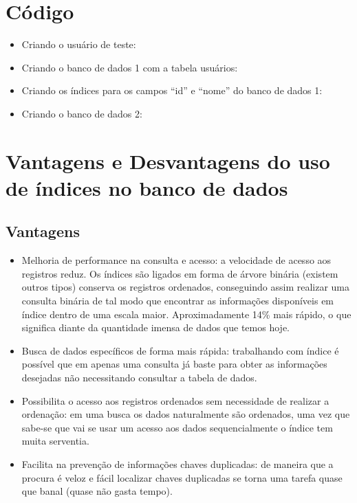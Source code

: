 \documentclass[12pt,a4paper]{article}
\begin{document}
\section{Código}

\begin{itemize}
	\item Criando o usuário de teste:
		
	\item Criando o banco de dados 1 com a tabela usuários:	
		
	\item Criando os índices para os campos “id” e “nome” do banco de dados 1:	
		
	\item Criando o banco de dados 2:	
		
\end{itemize}

\section{Vantagens e Desvantagens do uso de índices no banco de dados}

\subsection{Vantagens}

\begin{itemize}
	\item Melhoria de performance na consulta e acesso: a velocidade de acesso aos registros reduz. Os índices são ligados em forma de árvore binária (existem outros tipos) conserva os registros ordenados, conseguindo assim realizar uma consulta binária de tal modo que encontrar as informações disponíveis em índice dentro de uma escala maior. Aproximadamente 14\% mais rápido, o que significa diante da quantidade imensa de dados que temos hoje.
	
	\item Busca de dados específicos de forma mais rápida: trabalhando com índice é possível que em apenas uma consulta já baste para obter as informações desejadas não necessitando consultar a tabela de dados.
	
	\item Possibilita o acesso aos registros ordenados sem necessidade de realizar a ordenação: em uma busca os dados naturalmente são ordenados, uma vez que sabe-se que vai se usar um acesso aos dados sequencialmente o índice tem muita serventia.
	
	\item Facilita na prevenção de informações chaves duplicadas: de maneira que a procura é veloz e fácil localizar chaves duplicadas se torna uma tarefa quase que banal (quase não gasta tempo).	
	
\end{itemize}
\end{document}
